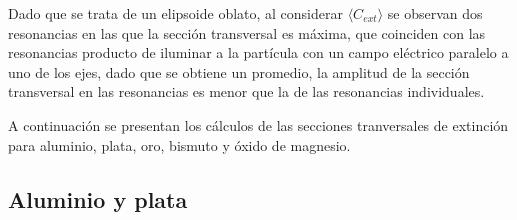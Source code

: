 Dado que se trata de un elipsoide oblato, al considerar $\langle C_{ext}\rangle$ se observan dos resonancias en las que la sección transversal es máxima, que coinciden con las resonancias producto de iluminar a la partícula con un campo eléctrico paralelo a uno de los ejes, dado que se obtiene un promedio, la amplitud de la sección transversal en las resonancias es menor que la de las resonancias individuales.

A continuación se presentan los cálculos de las secciones tranversales de extinción para aluminio, plata, oro, bismuto y óxido de magnesio.



\subsection*{Aluminio y plata}
